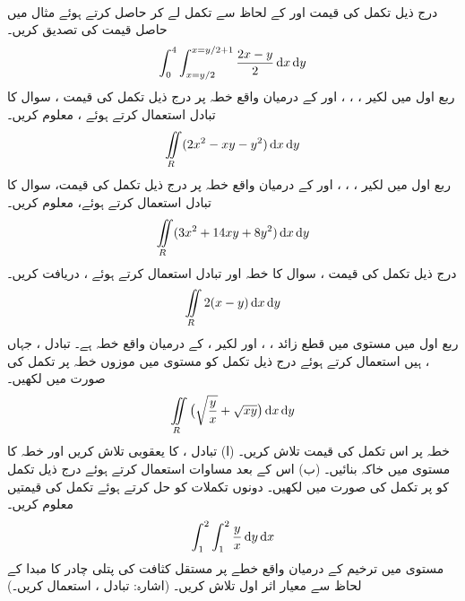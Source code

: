 \\
درج ذیل تکمل کی قیمت    اور  کے لحاظ سے تکمل  لے کر حاصل کرتے ہوئے  مثال  میں حاصل قیمت  کی تصدیق  کریں۔
 \begin{align*}
\int_0^4\int_{x=y/2}^{x=y/2+1}\frac{2x-y}{2}\dif x\dif y
\end{align*}
ربع اول میں  لکیر ، ، ،  اور  کے درمیان واقع خطہ   پر درج ذیل تکمل کی قیمت ، سوال  کا تبادل استعمال کرتے ہوئے ، معلوم کریں۔
\[\iint\limits_R(2x^2-xy-y^2)\dif x\dif y\]
ربع اول میں  لکیر ،    ، ،  اور  کے درمیان واقع   خطہ    پر درج ذیل تکمل کی قیمت،  سوال  کا تبادل استعمال کرتے ہوئے،  معلوم  کریں۔
\[\iint\limits_R(3x^2+14xy+8y^2)\dif x\dif y\]
درج ذیل تکمل کی قیمت  ، سوال   کا  خطہ   اور تبادل استعمال کرتے ہوئے ، دریافت کریں۔
\[\iint\limits_R 2(x-y)\dif x\dif y\] 
ربع اول میں مستوی  میں  قطع زائد ،  ،  اور لکیر ،  کے درمیان واقع خطہ  ہے۔ تبادل ،  جہاں  ،  ہیں استعمال  کرتے ہوئے درج ذیل تکمل کو  مستوی    میں موزوں خطہ  پر  تکمل کی صورت میں  لکھیں۔
\[\iint\limits_R \big(\sqrt{\frac{y}{x}}+\sqrt{xy}\big)\dif x\dif y\]
خطہ  پر اس  تکمل کی قیمت تلاش کریں۔
(ا)  تبادل ،  کا یعقوبی تلاش کریں اور خطہ  کا  مستوی  میں  خاکہ بنائیں۔ (ب) اس کے بعد مساوات  استعمال کرتے ہوئے درج ذیل تکمل  کو   پر  تکمل کی صورت میں لکھیں۔ دونوں تکملات کو حل کرتے ہوئے تکمل کی قیمتیں معلوم  کریں۔
\[\int_1^2\int_1^2\frac{y}{x}\dif y\dif x\]
مستوی  میں ترخیم  کے درمیان واقع خطے پر مستقل کثافت کی پتلی چادر  کا  مبدا کے لحاظ سے  معیار  اثر اول  تلاش کریں۔ (اشارہ: تبادل ،  استعمال کریں۔)
